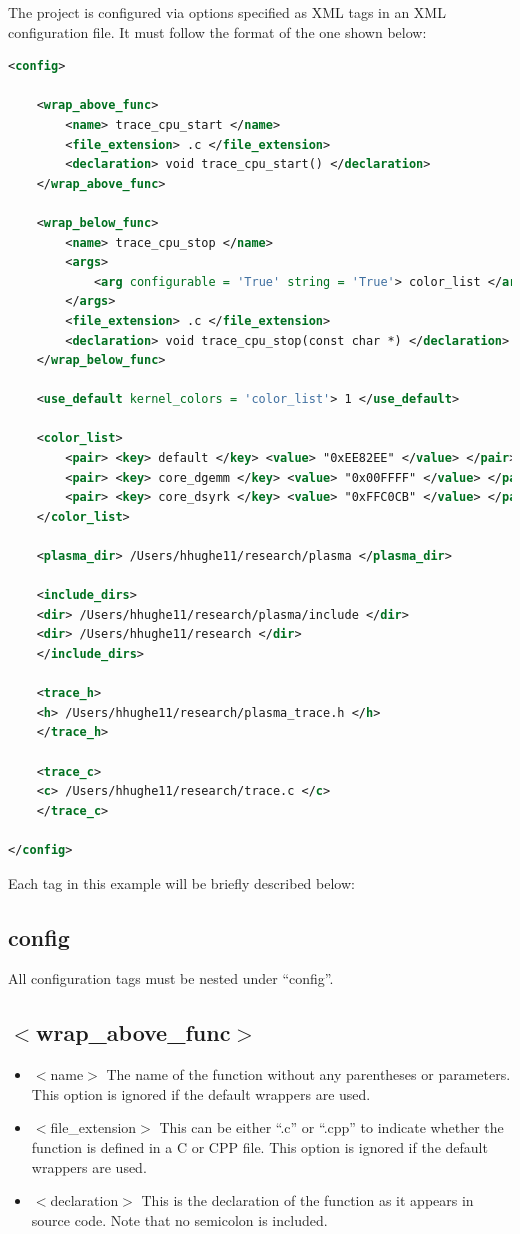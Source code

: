 \documentclass{article}
\begin{document}
The project is configured via options specified as XML tags in an XML configuration file. It must follow the format of the one shown below:
\begin{lstlisting}[language=XML]
<config>

    <wrap_above_func> 
        <name> trace_cpu_start </name>
        <file_extension> .c </file_extension>
        <declaration> void trace_cpu_start() </declaration>
    </wrap_above_func>
    
    <wrap_below_func> 
        <name> trace_cpu_stop </name>
        <args>
            <arg configurable = 'True' string = 'True'> color_list </arg>
        </args>
        <file_extension> .c </file_extension>
        <declaration> void trace_cpu_stop(const char *) </declaration>
    </wrap_below_func>

    <use_default kernel_colors = 'color_list'> 1 </use_default>

    <color_list>
        <pair> <key> default </key> <value> "0xEE82EE" </value> </pair>
        <pair> <key> core_dgemm </key> <value> "0x00FFFF" </value> </pair>
        <pair> <key> core_dsyrk </key> <value> "0xFFC0CB" </value> </pair>
    </color_list>

    <plasma_dir> /Users/hhughe11/research/plasma </plasma_dir>

    <include_dirs>
    <dir> /Users/hhughe11/research/plasma/include </dir>
    <dir> /Users/hhughe11/research </dir>
    </include_dirs>

    <trace_h>
    <h> /Users/hhughe11/research/plasma_trace.h </h>
    </trace_h>

    <trace_c>
    <c> /Users/hhughe11/research/trace.c </c>
    </trace_c>
    
</config>
\end{lstlisting}

Each tag in this example will be briefly described below:
\subsection{config}
All configuration tags must be nested under ``config''.

\subsection{$<$wrap\_above\_func$>$}
\begin{itemize}
\item $<$name$>$ The name of the function without any parentheses or parameters. This option is ignored if the default wrappers are used.
\item $<$file\_extension$>$ This can be either ``.c'' or ``.cpp'' to indicate whether the function is defined in a C or CPP file. This option is ignored if the default wrappers are used.
\item $<$declaration$>$ This is the declaration of the function as it appears in source code. Note that no semicolon is included.
\end{itemize}
\end{document}
